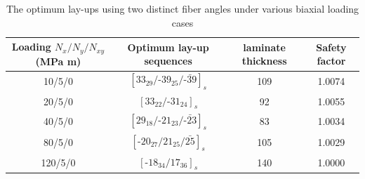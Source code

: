 \documentclass{article}
\begin{document}
\begin{table}
\caption{The optimum lay-ups using two distinct fiber angles under various biaxial loading cases}
\label{tab:two_distinct_angle}
\centering
\begin{tabular}{cccc}
	\toprule
	Loading	$N_{x}/N_{y}/N_{xy}$ (MPa m)	       & Optimum lay-up sequences                                   & laminate thickness &  Safety factor \\
	\midrule
	10/5/0                                         &  $[33_{29}/\text{-}39_{25}/\bar{\text{-}39}]_s$            &     109               &  1.0074 \\
	20/5/0                                         &  $[33_{22}/\text{-}31_{24}]_s$                             &     92               &  1.0055 \\
	40/5/0                                         &  $[29_{18}/\text{-}21_{23}/\bar{\text{-}23}]_s$            &     83               &  1.0034 \\
	80/5/0                                         &  $[\text{-}20_{27}/21_{25}/\bar{25}]_s$                    &     105               &  1.0029 \\
	120/5/0                                         &  $[\text{-}18_{34}/17_{36}]_s$                            &     140               &  1.0000 \\
	\bottomrule
\end{tabular}
\end{table}
\end{document}
